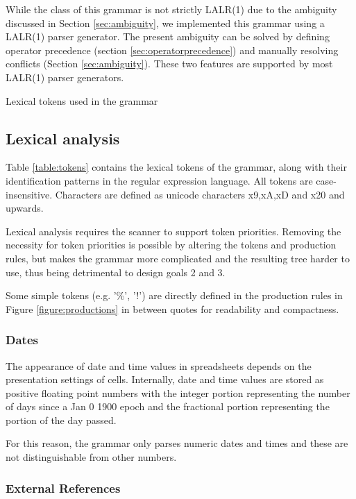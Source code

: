 \documentclass[conference]{IEEEtran}
\begin{document}
While the class of this grammar is not strictly LALR(1) due to the ambiguity discussed in Section \ref{sec:ambiguity}, we implemented this grammar using a LALR(1) parser generator.
The present ambiguity can be solved by defining operator precedence (section \ref{sec:operatorprecedence}) and manually resolving conflicts (Section \ref{sec:ambiguity}).
These two features are supported by most LALR(1) parser generators.
\begin{table}
\vspace{2mm}
\caption{Lexical tokens used in the grammar}
\label{table:tokens}

\end{table}

\subsection{Lexical analysis}
Table \ref{table:tokens} contains the lexical tokens of the grammar, along with their identification patterns in the regular expression language. All tokens are case-insensitive.
Characters are defined as unicode characters x9,xA,xD and x20 and upwards.

Lexical analysis requires the scanner to support token priorities. Removing the necessity for token priorities is possible by altering the tokens and production rules, but makes the grammar more complicated and the resulting tree harder to use, thus being detrimental to design goals 2 and 3.

Some simple tokens (e.g. '\%', '!') are directly defined in the production rules in Figure \ref{figure:productions} in between quotes for readability and compactness.

\subsubsection{\textbf{Dates}}

The appearance of date and time values in spreadsheets depends on the presentation settings of cells. Internally, date and time values are stored as positive floating point numbers with the integer portion representing the number of days since a Jan 0 1900 epoch and the fractional portion representing the portion of the day passed.

For this reason, the grammar only parses numeric dates and times and these are not distinguishable from other numbers.

\subsubsection{\textbf{External References}}
\end{document}
